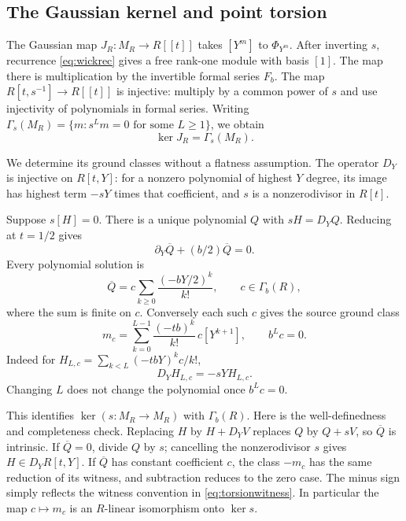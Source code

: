 \documentclass[11pt]{article}
\theoremstyle{definition}\newtheorem{definition}[theorem]{Definition}
\theoremstyle{remark}\newtheorem{remark}[theorem]{Remark}
\begin{document}
\subsection{The Gaussian kernel and point torsion}

The Gaussian map $J_R:M_R\to R[[t]]$ takes $[Y^m]$ to
$\Phi_{Y^m}$. After inverting $s$, recurrence
\eqref{eq:wickrec} gives a free rank-one module with basis $[1]$.
The map there is multiplication by the invertible formal series
$F_b$. The map $R[t,s^{-1}]\to R[[t]]$ is injective: multiply by
a common power of $s$ and use injectivity of polynomials in formal
series. Writing $\Gamma_s(M_R)=\{m:s^Lm=0\text{ for some }L\ge1\}$, we obtain
\begin{equation}\label{eq:kernel}
 \ker J_R=\Gamma_s(M_R).
\end{equation}

We determine its ground classes without a flatness assumption.
The operator $D_Y$ is injective on $R[t,Y]$: for a nonzero
polynomial of highest $Y$ degree, its image has highest term
$-sY$ times that coefficient, and $s$ is a nonzerodivisor in
$R[t]$.

Suppose $s[H]=0$. There is a unique polynomial $Q$ with
$sH=D_YQ$. Reducing at $t=1/2$ gives
\[
 \partial_Y\overline Q+(b/2)\overline Q=0.
\]
Every polynomial solution is
\[
 \overline Q=c\sum_{k\ge0}\frac{(-bY/2)^k}{k!},
 \qquad c\in\Gamma_b(R),
\]
where the sum is finite on $c$. Conversely each such $c$ gives
the source ground class
\begin{equation}\label{eq:ground}
 m_c=\sum_{k=0}^{L-1}\frac{(-tb)^k}{k!}\,c[Y^{k+1}],
                  \qquad b^Lc=0.
\end{equation}
Indeed for $H_{L,c}=\sum_{k<L}(-tbY)^kc/k!$,
\begin{equation}\label{eq:torsionwitness}
 D_YH_{L,c}=-sYH_{L,c}.
\end{equation}
Changing $L$ does not change the polynomial once $b^Lc=0$.

This identifies $\ker(s:M_R\to M_R)$ with $\Gamma_b(R)$.
Here is the well-definedness and completeness check. Replacing
$H$ by $H+D_YV$ replaces $Q$ by $Q+sV$, so $\overline Q$
is intrinsic. If $\overline Q=0$, divide $Q$ by $s$; cancelling
the nonzerodivisor $s$ gives $H\in D_YR[t,Y]$. If
$\overline Q$ has constant coefficient $c$, the class $-m_c$
has the same reduction of its witness, and subtraction reduces
to the zero case. The minus sign simply reflects the witness
convention in \eqref{eq:torsionwitness}. In particular the map
$c\mapsto m_c$ is an $R$-linear isomorphism onto $\ker s$.
\end{document}
